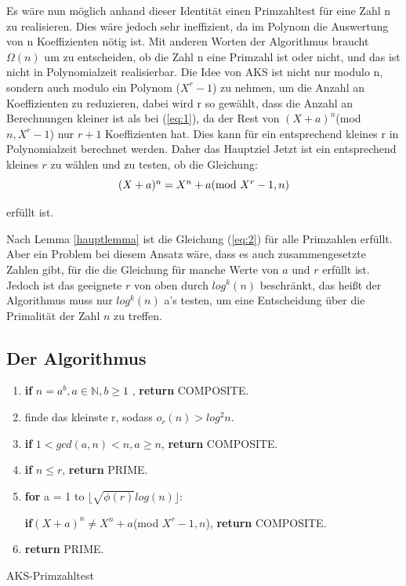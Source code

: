 \documentclass[12pt,oneside]{article}
\theoremstyle{remark}
\theoremstyle{definition}
\begin{document}
\begin{flushleft}
Es wäre nun möglich anhand dieser Identität einen Primzahltest für eine Zahl n zu realisieren. Dies wäre jedoch sehr ineffizient, da im Polynom die Auswertung von n Koeffizienten nötig ist. Mit anderen Worten der Algorithmus braucht $\Omega(n)$ um zu entscheiden, ob die Zahl n eine Primzahl ist oder nicht, und das ist nicht in Polynomialzeit realisierbar. Die Idee von AKS ist nicht nur modulo n, sondern auch modulo ein Polynom ($X^r -1$) zu nehmen, um die Anzahl an Koeffizienten zu reduzieren, dabei wird r so gewählt, dass die Anzahl an Berechnungen kleiner ist als bei (\ref{eq:1}), da der Rest von $(X + a)^n$(mod $ n, X^r - 1$) nur $ r + 1$ Koeffizienten hat. Dies kann für ein entsprechend kleines r in Polynomialzeit berechnet werden. Daher das Hauptziel Jetzt ist ein entsprechend kleines $r$ zu wählen und zu testen, ob die Gleichung:\newline\newline
\begin{equation}\label{eq:2}
    \centerline{$(X + a)^n = X^n + a $(mod $X^r - 1, n$)}
\end{equation}

erfüllt ist.\newline

Nach Lemma \ref{hauptlemma} ist die Gleichung (\ref{eq:2}) für alle Primzahlen erfüllt. Aber ein Problem bei diesem Ansatz wäre, dass es auch zusammengesetzte Zahlen gibt, für die die Gleichung für manche Werte von $a$ und $r$ erfüllt ist. Jedoch ist das geeignete $r$ von oben durch $log^k(n)$ beschränkt, das heißt der Algorithmus muss nur $log^k(n)$ a's testen, um eine Entscheidung über die Primalität der Zahl $n$ zu treffen.

\end{flushleft}
\subsection{Der Algorithmus}\label{algo}
\begin{algorithm}[H]
\SetAlgoLined
{}

\begin{enumerate}
\item \textbf{if} $n = a^b, a \in \mathbb{N}, b \geq 1$ , \textbf{return} COMPOSITE.
\item  finde das kleinste r, sodass $o_{r}(n) > log^2 n $.
\item \textbf{if} $1 < gcd(a,n) < n, a \geq n $, \textbf{return} COMPOSITE.
\item \textbf{if} $n \leq r $, \textbf{return} PRIME.
\item \textbf{for} a = 1 to $\lfloor \sqrt{\phi(r)}log(n) \rfloor$:

 \textbf{if}$(X + a)^n \neq X^n + a $(mod $X^r - 1, n$), \textbf{return} COMPOSITE.
 \item \textbf{return} PRIME.
\end{enumerate}
 
\caption{AKS-Primzahltest}
\end{algorithm}
\end{document}
